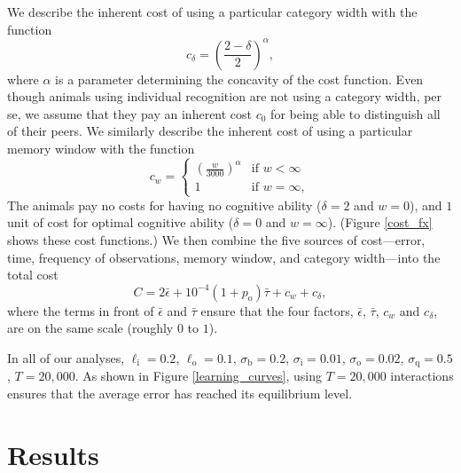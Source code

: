 We describe the inherent cost of using a particular category width with the function
\begin{equation*}
c_\delta = \left(\frac{2-\delta}{2}\right)^\alpha,
\end{equation*}
where $\alpha$ is a parameter determining the concavity of the cost function. 
Even though animals using individual recognition are not using a category width, per se, we assume that they pay an inherent cost $c_0$ for being able to distinguish all of their peers.
We similarly describe the inherent cost of using a particular memory window with the function
\begin{equation*}
c_w = \left\{\begin{array}{lll}\left(\frac{w}{3000}\right)^\alpha & \text{if } w<\infty
\\ 1 & \text{if } w=\infty, \end{array}\right.
\end{equation*}
The animals pay no costs for having no cognitive ability ($\delta=2$ and $w=0$), and $1$ unit of cost for optimal cognitive ability ($\delta=0$ and $w=\infty$). (Figure \ref{cost_fx} shows these cost functions.)
We then combine the five sources of cost---error, time, frequency of observations, memory window, and category width---into the total cost 
\begin{equation*}
C = 2\bar{\epsilon}+10^{-4}(1+p_\text{o})\bar{\tau}+c_w+c_\delta,
\end{equation*}
where the terms in front of $\bar{\epsilon}$ and $\bar{\tau}$ ensure that the four factors, $\bar{\epsilon}$, $\bar{\tau}$, $c_w$ and $c_\delta$, are on the same scale (roughly $0$ to $1$). 

In all of our analyses, $\ell_\text{i}=0.2$, $\ell_\text{o}=0.1$, $\sigma_\text{b}=0.2$, $\sigma_\text{i}=0.01$, $\sigma_\text{o}=0.02$, $\sigma_\text{q}=0.5$, $T=20,000$. As shown in Figure \ref{learning_curves}, using $T=20,000$ interactions ensures that the average error has reached its equilibrium level.



\section*{Results}
%
